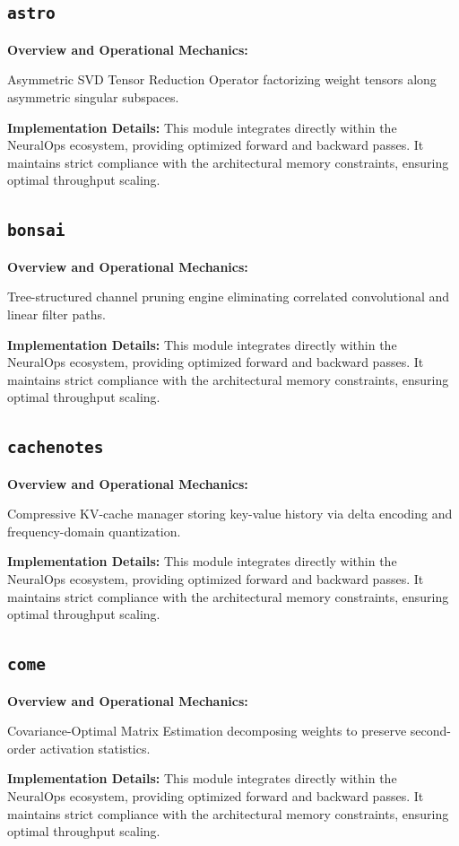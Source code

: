\documentclass[10pt,twocolumn,letterpaper]{article}
\begin{document}
\subsection{\texttt{astro}}
\textbf{Overview and Operational Mechanics:}

Asymmetric SVD Tensor Reduction Operator factorizing weight tensors along asymmetric singular subspaces.

\textbf{Implementation Details:}
This module integrates directly within the NeuralOps ecosystem, providing optimized forward and backward passes. It maintains strict compliance with the architectural memory constraints, ensuring optimal throughput scaling.

\subsection{\texttt{bonsai}}
\textbf{Overview and Operational Mechanics:}

Tree-structured channel pruning engine eliminating correlated convolutional and linear filter paths.

\textbf{Implementation Details:}
This module integrates directly within the NeuralOps ecosystem, providing optimized forward and backward passes. It maintains strict compliance with the architectural memory constraints, ensuring optimal throughput scaling.

\subsection{\texttt{cachenotes}}
\textbf{Overview and Operational Mechanics:}

Compressive KV-cache manager storing key-value history via delta encoding and frequency-domain quantization.

\textbf{Implementation Details:}
This module integrates directly within the NeuralOps ecosystem, providing optimized forward and backward passes. It maintains strict compliance with the architectural memory constraints, ensuring optimal throughput scaling.

\subsection{\texttt{come}}
\textbf{Overview and Operational Mechanics:}

Covariance-Optimal Matrix Estimation decomposing weights to preserve second-order activation statistics.

\textbf{Implementation Details:}
This module integrates directly within the NeuralOps ecosystem, providing optimized forward and backward passes. It maintains strict compliance with the architectural memory constraints, ensuring optimal throughput scaling.
\end{document}
